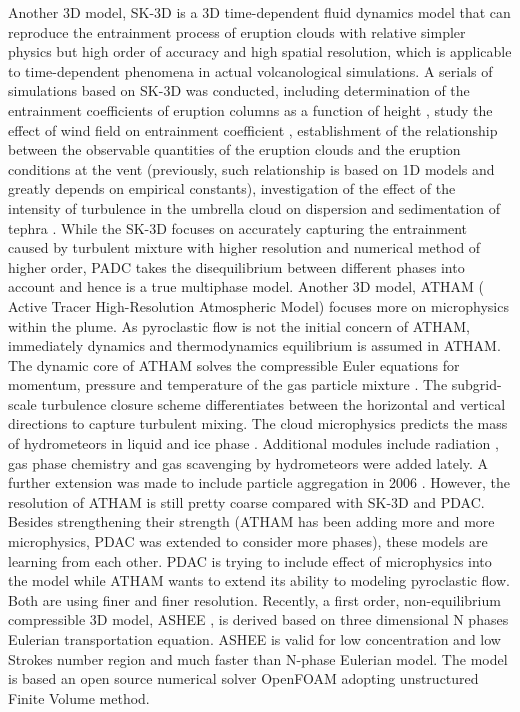 \documentclass[journal abbreviation, manuscript]{copernicus}
\begin{document}
Another 3D model, SK-3D \citep{suzuki2005numerical} is a 3D time-dependent fluid dynamics model that can reproduce the entrainment process of eruption clouds with relative simpler physics but high order of accuracy and high spatial resolution, which is applicable to time-dependent phenomena in actual volcanological simulations. 
A serials of simulations based on SK-3D was conducted, including determination of the entrainment coefficients of eruption columns as a function of height \citep{suzuki2010numerical}, study the effect of wind field on entrainment coefficient \citep{suzuki20133d}, establishment of the relationship between the observable quantities of the eruption clouds and the eruption conditions at the vent \citep{suzuki2009three} (previously, such relationship is based on 1D models and greatly depends on empirical constants), investigation of the effect of the intensity of turbulence in the umbrella cloud on dispersion and sedimentation of tephra \citep{koyaguchi2009effect}. 
While the SK-3D focuses on accurately capturing the entrainment caused by turbulent mixture with higher resolution and numerical method of higher order, PADC takes the disequilibrium between different phases into account and hence is a true multiphase model. Another 3D model, ATHAM ( Active Tracer High-Resolution Atmospheric Model) \citep{oberhuber1998volcanic} focuses more on microphysics within the plume. As pyroclastic flow is not the initial concern of ATHAM, immediately dynamics and thermodynamics equilibrium is assumed in ATHAM. The dynamic core of ATHAM solves the compressible Euler equations for momentum, pressure and temperature of the gas particle mixture \citep{oberhuber1998volcanic}. The subgrid-scale turbulence closure scheme differentiates between the horizontal and vertical directions \citep{herzog2003prognostic} to capture turbulent mixing. The cloud microphysics predicts the mass of hydrometeors in liquid and ice phase \citep{herzog1998effect}. Additional modules include radiation \citep{langmann1997radiative}, gas phase chemistry \citep{trentmann2002simulation} and gas scavenging by hydrometeors \citep{textor2003injection} were added lately. A further extension was made to include particle aggregation in 2006 \citep{textor2006volcanic1, textor2006volcanic2}. However, the resolution of ATHAM is still pretty coarse compared with SK-3D and PDAC.
Besides strengthening their strength (ATHAM has been adding more and more microphysics, PDAC was extended to consider more phases), these models are learning from each other. PDAC is trying to include effect of microphysics into the model while ATHAM wants to extend its ability to modeling pyroclastic flow. Both are using finer and finer resolution. Recently, a first order, non-equilibrium compressible 3D model, ASHEE \citep{cerminara2016ashee}, is derived based on three dimensional N phases Eulerian transportation equation. ASHEE is valid for low concentration and low Strokes number region and much faster than N-phase Eulerian model. The model is based an open source numerical solver OpenFOAM adopting unstructured Finite Volume method.\\
\end{document}
